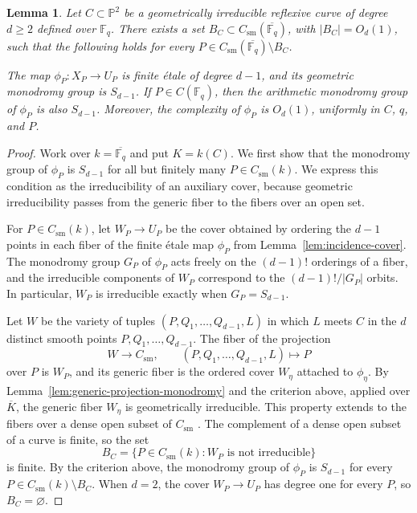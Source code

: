\documentclass[10pt,a4paper]{amsart}
\newtheorem{lemma}[theorem]{Lemma}
\theoremstyle{definition}
\theoremstyle{remark}
\newcommand{\Fq}{\mathbb{F}_q}
\newcommand{\bP}{\mathbb{P}}
\begin{document}
\begin{lemma}\label{lem:projection-monodromy}
Let $C\subset\bP^2$ be a geometrically irreducible reflexive curve of degree $d\geq2$ defined over $\Fq$. There exists a set $B_C\subset C_{\mathrm{sm}}(\overline{\Fq})$, with $|B_C|=O_d(1)$, such that the following holds for every
$P\in C_{\mathrm{sm}}(\overline{\Fq})\setminus B_C$.

The map $\phi_P\colon X_P\to U_P$ is finite \'etale of degree $d-1$, and its geometric monodromy group is $S_{d-1}$. If $P\in C(\Fq)$, then the arithmetic monodromy group of $\phi_P$ is also $S_{d-1}$. Moreover, the complexity of $\phi_P$ is $O_d(1)$, uniformly in $C$, $q$, and $P$.
\end{lemma}

\begin{proof}
Work over $k=\overline{\Fq}$ and put $K=k(C)$. We first show that the monodromy group of $\phi_P$ is $S_{d-1}$ for all but finitely many $P\in C_{\mathrm{sm}}(k)$. We express this condition as the irreducibility of an auxiliary cover, because geometric irreducibility passes from the generic fiber to the fibers over an open set.

For $P\in C_{\mathrm{sm}}(k)$, let $W_P\to U_P$ be the cover obtained by ordering the $d-1$ points in each fiber of the finite \'etale map $\phi_P$ from Lemma~\ref{lem:incidence-cover}. The monodromy group $G_P$ of $\phi_P$ acts freely on the $(d-1)!$ orderings of a fiber, and the irreducible components of $W_P$ correspond to the $(d-1)!/|G_P|$ orbits. In particular, $W_P$ is irreducible exactly when $G_P=S_{d-1}$.

Let $W$ be the variety of tuples $(P,Q_1,\ldots,Q_{d-1},L)$ in which $L$ meets $C$ in the $d$ distinct smooth points $P,Q_1,\ldots,Q_{d-1}$. The fiber of the projection
\[
W\longrightarrow C_{\mathrm{sm}},
\qquad (P,Q_1,\ldots,Q_{d-1},L)\longmapsto P
\]
over $P$ is $W_P$, and its generic fiber is the ordered cover $W_\eta$ attached to $\phi_\eta$. By Lemma~\ref{lem:generic-projection-monodromy} and the criterion above, applied over $\overline K$, the generic fiber $W_\eta$ is geometrically irreducible. This property extends to the fibers over a dense open subset of $C_{\mathrm{sm}}$ \cite[Tag~0559]{Stacks}. The complement of a dense open subset of a curve is finite, so the set
\[
B_C=\{P\in C_{\mathrm{sm}}(k):W_P\text{ is not irreducible}\}
\]
is finite. By the criterion above, the monodromy group of $\phi_P$ is $S_{d-1}$ for every $P\in C_{\mathrm{sm}}(k)\setminus B_C$. When $d=2$, the cover $W_P\to U_P$ has degree one for every $P$, so $B_C=\varnothing$.


\end{proof}
\end{document}
